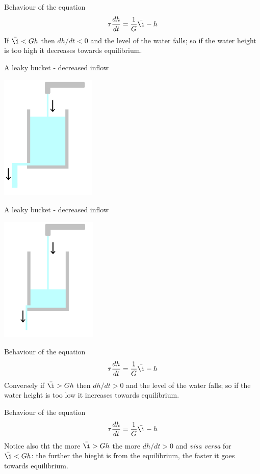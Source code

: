 \documentclass{beamer}
\newcommand{\crish}{\color{reddish}}
\newcommand{\cbla}{\color{black}}
\newcommand{\cblu}{\color{blue}}
\begin{document}
\begin{frame}{Behaviour of the equation}
  \crish
  $$\tau\frac{dh}{dt}=\frac{1}{G}\bar{\i}-h$$\cbla If
  \cblu{}$\bar{\i}<Gh$\cbla{} then \cblu{}$dh/dt<0$\cbla{} and the
  level of the water falls; so if the water height is too high it
  decreases towards equilibrium.
\end{frame}


\begin{frame}{A leaky bucket - decreased inflow}

  \begin{center}
    \includegraphics[height=6cm]{glass_tap_down.png}
  \end{center}
  
  
\end{frame}



\begin{frame}{A leaky bucket - decreased inflow}

  \begin{center}
    \includegraphics[height=6cm]{glass_level_down.png}
  \end{center}
  
\end{frame}


\begin{frame}{Behaviour of the equation}
  \crish
  $$\tau\frac{dh}{dt}=\frac{1}{G}\bar{\i}-h$$\cbla Conversely if
  \cblu{}$\bar{\i}>Gh$\cbla{} then \cblu{}$dh/dt>0$\cbla{} and the
  level of the water falls; so if the water height is too low it
  increases towards equilibrium.
\end{frame}


\begin{frame}{Behaviour of the equation}
  \crish
  $$\tau\frac{dh}{dt}=\frac{1}{G}\bar{\i}-h$$\cbla Notice also tht the more
  \crish{}$\bar{\i}>Gh$\cbla{} the more \crish{}$dh/dt>0$\cbla{} and \textsl{visa versa} for \crish{}$\bar{\i}<Gh$\cbla: the further the hieght is from the equilibrium, the faster it goes towards equilibrium.
\end{frame}
\end{document}

